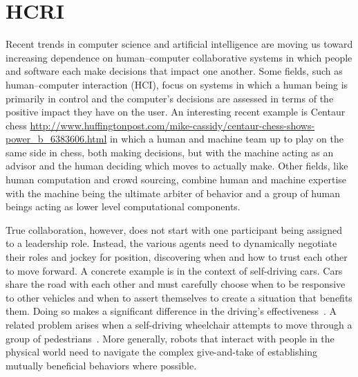 

\section{HCRI}

Recent trends in computer science and artificial intelligence are
moving us toward increasing dependence on human--computer
collaborative systems in which people and software each make decisions
that impact one another. Some fields, such as human--computer
interaction (HCI), focus on systems in which a human being is
primarily in control and the computer's decisions are assessed in
terms of the positive impact they have on the user. An interesting
recent example is Centaur chess
\url{http://www.huffingtonpost.com/mike-cassidy/centaur-chess-shows-power_b_6383606.html}
in which a human and machine team up to play on the same side in
chess, both making decisions, but with the machine acting as an
advisor and the human deciding which moves to actually make. Other
fields, like human computation and crowd sourcing, combine human and
machine expertise with the machine being the ultimate arbiter of
behavior and a group of human beings acting as lower level
computational components.

True collaboration, however, does not start with one participant being
assigned to a leadership role. Instead, the various agents need to
dynamically negotiate their roles and jockey for position, discovering
when and how to trust each other to move forward. A concrete example
is in the context of self-driving cars. Cars share the road with each
other and must carefully choose when to be responsive to other
vehicles and when to assert themselves to create a situation that
benefits them. Doing so makes a significant difference in the driving's
effectiveness~\cite{cunningham2015mpdm}. A related problem arises when
a self-driving wheelchair attempts to move through a group of
pedestrians~\cite{kim2016socially}. More generally, robots that
interact with people in the physical world need to navigate the
complex give-and-take of establishing mutually beneficial behaviors
where possible.

